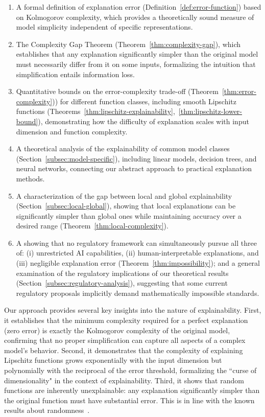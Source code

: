 \documentclass[11pt,letter,leqno]{article}
\begin{document}
\begin{enumerate}
    \item A formal definition of explanation error (Definition~\ref{def:error-function}) based on Kolmogorov complexity, which provides a theoretically sound measure of model simplicity independent of specific representations.
    
    \item The Complexity Gap Theorem (Theorem~\ref{thm:complexity-gap}), which establishes that any explanation significantly simpler than the original model must necessarily differ from it on some inputs, formalizing the intuition that simplification entails information loss.
    
    \item Quantitative bounds on the error-complexity trade-off (Theorem~\ref{thm:error-complexity})) for different function classes, including smooth Lipschitz functions (Theorems~\ref{thm:lipschitz-explainability},~\ref{thm:lipschitz-lower-bound}), demonstrating how the difficulty of explanation scales with input dimension and function complexity.

    \item A theoretical analysis of the explainability of common model classes (Section~\ref{subsec:model-specific}), including linear models, decision trees, and neural networks, connecting our abstract approach to practical explanation methods.
      
    \item A characterization of the gap between local and global explainability (Section~\ref{subsec:local-global}), showing that local explanations can be significantly simpler than global ones while maintaining accuracy over a desired range (Theorem~\ref{thm:local-complexity}).
    
    \item A showing that no regulatory framework can simultaneously pursue all three of: (i) unrestricted AI capabilities, (ii) human-interpretable explanations, and (iii) negligible explanation error (Theorem~\ref{thm:impossibility}); and a general examination of the regulatory implications of our theoretical results (Section~\ref{subsec:regulatory-analysis}), suggesting that some current regulatory proposals implicitly demand mathematically impossible standards.
\end{enumerate}

Our approach provides several key insights into the nature of explainability.  First, it establishes that the minimum complexity required for a perfect explanation (zero error) is exactly the Kolmogorov complexity of the original model, confirming that no proper simplification can capture all aspects of a complex model's behavior.  Second, it demonstrates that the complexity of explaining Lipschitz functions grows exponentially with the input dimension but polynomially with the reciprocal of the error threshold, formalizing the ``curse of dimensionality" in the context of explainability.  Third, it shows that random functions are inherently unexplainable: any explanation significantly simpler than the original function must have substantial error.  This is in line with the known results about randomness~\cite{Calude2002}.
\end{document}
